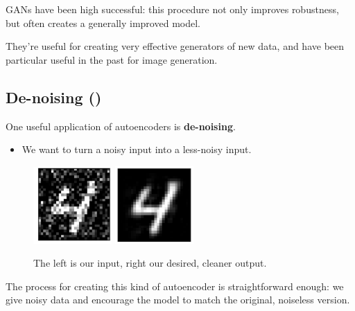         GANs have been high successful: this procedure not only improves robustness, but often creates a generally improved model. 

        They're useful for creating very effective generators of new data, and have been particular useful in the past for image generation.

    \pagebreak

    \subsection{De-noising ()}

        One useful application of autoencoders is \textbf{de-noising}.

        \begin{itemize}
            \item We want to turn a noisy input into a less-noisy input.
        \end{itemize}

        \begin{figure}[H]
            \centering
            \includegraphics[width=30mm,scale=0.5]{images/autoencoder_images/noisy_4.png}
            \;\;
            \includegraphics[width=30mm,scale=0.5]
            {images/autoencoder_images/clean_4.png}
            \caption*{The left is our input, right our desired, cleaner output.}
        \end{figure}

        The process for creating this kind of autoencoder is straightforward enough: we give noisy data and encourage the model to match the original, noiseless version.\\

